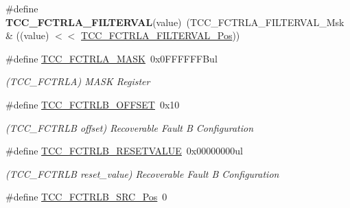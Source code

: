 \begin{DoxyCompactItemize}
\item 
\hypertarget{group___s_a_m_l21___t_c_c_ga55cad1c7f6bcdbd35d369df33a52c1e4}{}\#define {\bfseries T\+C\+C\+\_\+\+F\+C\+T\+R\+L\+A\+\_\+\+F\+I\+L\+T\+E\+R\+V\+A\+L}(value)~(T\+C\+C\+\_\+\+F\+C\+T\+R\+L\+A\+\_\+\+F\+I\+L\+T\+E\+R\+V\+A\+L\+\_\+\+Msk \& ((value) $<$$<$ \hyperlink{group___s_a_m_l21___t_c_c_gaab46a753411d94b285656e75d74b7f7c}{T\+C\+C\+\_\+\+F\+C\+T\+R\+L\+A\+\_\+\+F\+I\+L\+T\+E\+R\+V\+A\+L\+\_\+\+Pos}))\label{group___s_a_m_l21___t_c_c_ga55cad1c7f6bcdbd35d369df33a52c1e4}

\item 
\hypertarget{group___s_a_m_l21___t_c_c_gaf3a25ec7210446584531d3b34c2a9b9e}{}\#define \hyperlink{group___s_a_m_l21___t_c_c_gaf3a25ec7210446584531d3b34c2a9b9e}{T\+C\+C\+\_\+\+F\+C\+T\+R\+L\+A\+\_\+\+M\+A\+S\+K}~0x0\+F\+F\+F\+F\+F\+F\+Bul\label{group___s_a_m_l21___t_c_c_gaf3a25ec7210446584531d3b34c2a9b9e}

\begin{DoxyCompactList}\small\item\em (T\+C\+C\+\_\+\+F\+C\+T\+R\+L\+A) M\+A\+S\+K Register \end{DoxyCompactList}\item 
\hypertarget{group___s_a_m_l21___t_c_c_gac9e910f72badbdb0cb3d0d4df81d04a2}{}\#define \hyperlink{group___s_a_m_l21___t_c_c_gac9e910f72badbdb0cb3d0d4df81d04a2}{T\+C\+C\+\_\+\+F\+C\+T\+R\+L\+B\+\_\+\+O\+F\+F\+S\+E\+T}~0x10\label{group___s_a_m_l21___t_c_c_gac9e910f72badbdb0cb3d0d4df81d04a2}

\begin{DoxyCompactList}\small\item\em (T\+C\+C\+\_\+\+F\+C\+T\+R\+L\+B offset) Recoverable Fault B Configuration \end{DoxyCompactList}\item 
\hypertarget{group___s_a_m_l21___t_c_c_ga6dcb26ff5adaa6c5dc5bc88251a322ef}{}\#define \hyperlink{group___s_a_m_l21___t_c_c_ga6dcb26ff5adaa6c5dc5bc88251a322ef}{T\+C\+C\+\_\+\+F\+C\+T\+R\+L\+B\+\_\+\+R\+E\+S\+E\+T\+V\+A\+L\+U\+E}~0x00000000ul\label{group___s_a_m_l21___t_c_c_ga6dcb26ff5adaa6c5dc5bc88251a322ef}

\begin{DoxyCompactList}\small\item\em (T\+C\+C\+\_\+\+F\+C\+T\+R\+L\+B reset\+\_\+value) Recoverable Fault B Configuration \end{DoxyCompactList}\item 
\hypertarget{group___s_a_m_l21___t_c_c_ga8cc27791b6546da73f032510287b61d5}{}\#define \hyperlink{group___s_a_m_l21___t_c_c_ga8cc27791b6546da73f032510287b61d5}{T\+C\+C\+\_\+\+F\+C\+T\+R\+L\+B\+\_\+\+S\+R\+C\+\_\+\+Pos}~0\label{group___s_a_m_l21___t_c_c_ga8cc27791b6546da73f032510287b61d5}


\end{DoxyCompactItemize}
